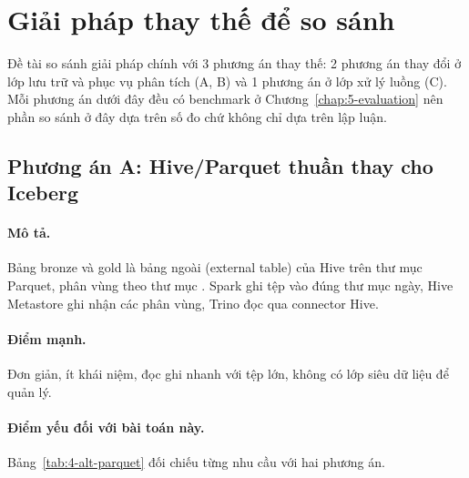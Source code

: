 \section{Giải pháp thay thế để so sánh}
\label{sec:4-alternative}

Đề tài so sánh giải pháp chính với 3 phương án thay thế: 2 phương án thay đổi ở lớp lưu trữ và phục vụ phân tích (A, B) và 1 phương án ở lớp xử lý luồng (C). Mỗi phương án dưới đây đều có benchmark ở Chương~\ref{chap:5-evaluation} nên phần so sánh ở đây dựa trên số đo chứ không chỉ dựa trên lập luận.

\subsection{Phương án A: Hive/Parquet thuần thay cho Iceberg}
\label{sec:4-alt-parquet}

\paragraph{Mô tả.} Bảng bronze và gold là bảng ngoài (external table) của Hive trên thư mục Parquet, phân vùng theo thư mục . Spark ghi tệp vào đúng thư mục ngày, Hive Metastore ghi nhận các phân vùng, Trino đọc qua connector Hive.

\paragraph{Điểm mạnh.} Đơn giản, ít khái niệm, đọc ghi nhanh với tệp lớn, không có lớp siêu dữ liệu để quản lý.

\paragraph{Điểm yếu đối với bài toán này.} Bảng~\ref{tab:4-alt-parquet} đối chiếu từng nhu cầu với hai phương án.

